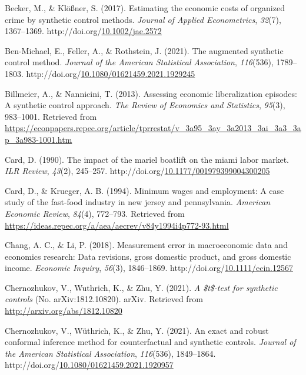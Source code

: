 \documentclass[12pt,nobind, a4paper]{reedthesis}
\newlength{\cslhangindent}
\newenvironment{CSLReferences}[2] %
{%
	\setlength{\parindent}{0pt}
	\ifodd #1 \everypar{\setlength{\hangindent}{\cslhangindent}}\ignorespaces\fi
	\ifnum #2 > 0
	\setlength{\parskip}{#2\baselineskip}
	\fi
}%
{}
\begin{document}
\begin{CSLReferences}{1}{0}
 \leavevmode{}%
 Becker, M., \& Klößner, S. (2017). Estimating the economic costs of organized crime by synthetic control methods. \emph{Journal of Applied Econometrics}, \emph{32}(7), 1367--1369. http://doi.org/\href{https://doi.org/10.1002/jae.2572}{10.1002/jae.2572}

 \leavevmode{}%
 Ben-Michael, E., Feller, A., \& Rothstein, J. (2021). The augmented synthetic control method. \emph{Journal of the American Statistical Association}, \emph{116}(536), 1789--1803. http://doi.org/\href{https://doi.org/10.1080/01621459.2021.1929245}{10.1080/01621459.2021.1929245}

 \leavevmode{}%
 Billmeier, A., \& Nannicini, T. (2013). Assessing economic liberalization episodes: A synthetic control approach. \emph{The Review of Economics and Statistics}, \emph{95}(3), 983--1001. Retrieved from \url{https://econpapers.repec.org/article/tprrestat/v_3a95_3ay_3a2013_3ai_3a3_3ap_3a983-1001.htm}

 \leavevmode{}%
 Card, D. (1990). The impact of the mariel boatlift on the miami labor market. \emph{{ILR} Review}, \emph{43}(2), 245--257. http://doi.org/\href{https://doi.org/10.1177/001979399004300205}{10.1177/001979399004300205}

 \leavevmode{}%
 Card, D., \& Krueger, A. B. (1994). Minimum wages and employment: A case study of the fast-food industry in new jersey and pennsylvania. \emph{American Economic Review}, \emph{84}(4), 772--793. Retrieved from \url{https://ideas.repec.org/a/aea/aecrev/v84y1994i4p772-93.html}

 \leavevmode{}%
 Chang, A. C., \& Li, P. (2018). Measurement error in macroeconomic data and economics research: Data revisions, gross domestic product, and gross domestic income. \emph{Economic Inquiry}, \emph{56}(3), 1846--1869. http://doi.org/\href{https://doi.org/10.1111/ecin.12567}{10.1111/ecin.12567}

 \leavevmode{}%
 Chernozhukov, V., Wuthrich, K., \& Zhu, Y. (2021). \emph{A \$t\$-test for synthetic controls} (No. {arXiv}:1812.10820). {arXiv}. Retrieved from \url{http://arxiv.org/abs/1812.10820}

 \leavevmode{}%
 Chernozhukov, V., Wüthrich, K., \& Zhu, Y. (2021). An exact and robust conformal inference method for counterfactual and synthetic controls. \emph{Journal of the American Statistical Association}, \emph{116}(536), 1849--1864. http://doi.org/\href{https://doi.org/10.1080/01621459.2021.1920957}{10.1080/01621459.2021.1920957}


\end{CSLReferences}
\end{document}
